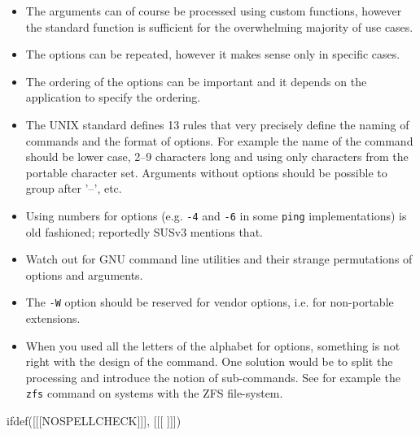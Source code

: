 \begin{itemize}
\item The arguments can of course be processed using custom functions, however
the standard function is sufficient for the overwhelming majority of use cases.
\item The options can be repeated, however it makes sense only in specific
cases.
\item The ordering of the options can be important and it depends on the
application to specify the ordering.
\item The UNIX standard defines 13 rules that very precisely define the naming
of commands and the format of options. For example the name of the command
should be lower case, 2--9 characters long and using only characters from
the portable character set. Arguments without options should be possible to group
after '--', etc.
\item Using numbers for options (e.g. \texttt{-4} and \texttt{-6} in some
\texttt{ping} implementations) is old fashioned;
reportedly SUSv3 mentions that.
\item Watch out for GNU command line utilities and their strange permutations
of options and arguments.
\item The \texttt{-W} option should be reserved for vendor options, i.e. for
non-portable extensions.
\item When you used all the letters of the alphabet for options, something
is not right with the design of the command. One solution would be to
split the processing and introduce the notion of sub-commands. See for
example the \texttt{zfs} command on systems with the ZFS file-system.
\end{itemize}


ifdef([[[NOSPELLCHECK]]], [[[
]]])

